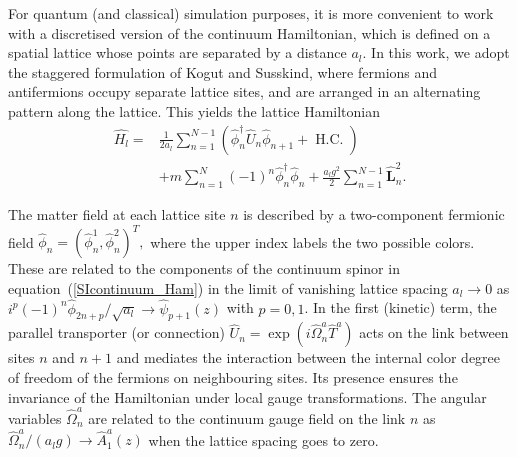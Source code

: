 \documentclass[twocolumn,aps,showpacs,prb,superscriptaddress,floatfix,10pt,nofootinbib]{revtex4-2}
\begin{document}
For quantum (and classical) simulation purposes, it is more convenient to work with a discretised version of the continuum Hamiltonian, which is defined on a spatial lattice whose points are separated by a distance $a_l$. In this work, we adopt the staggered formulation of Kogut and Susskind, where fermions and antifermions occupy separate lattice sites, and are arranged in an alternating pattern along the lattice. This yields the lattice Hamiltonian
\begin{equation}
\begin{split}
\hat{H_l} = &\frac{1}{2a_l} \sum_{n=1}^{N-1} \left( \hat{\phi}_{n}^\dagger \hat{U}_{n} \hat{\phi}_{n+1} + \operatorname{H.C.}\right)\\ & +m \sum_{n=1}^{N} (-1)^{n} \hat{\phi}_{n}^\dagger \hat{\phi}_{n}  + \frac{a_l g^{2}}{2} \sum_{n=1}^{N-1} \hat{\boldsymbol{L}}_{n}^{2}. \label{SIeq:KSham}
\end{split}
\end{equation}

The matter field at each lattice site $n$ is described by a two-component fermionic field $\hat{\phi}_{n}=(\hat{\phi}_{n}^{1},\hat{\phi}_{n}^{2})^{T},$
where the upper index labels the two possible colors. These are related to the components of the continuum spinor in equation~(\ref{SIcontinuum_Ham}) in the limit of vanishing lattice spacing $a_l \rightarrow 0$ as $i^{p}(-1)^{n}\hat{\phi}_{2n+p}/\sqrt{a_l}\rightarrow \hat{\psi}_{p+1}(z)$ with $p=0,1$.
In the first (kinetic) term, the parallel transporter (or connection) $\hat{U}_n=\exp(i\hat{\Omega}_{n}^{a}\hat{T}^{a})$ acts on the link between sites $n$ and $n+1$ and mediates the interaction between the internal color degree of freedom of the fermions on neighbouring sites. Its presence ensures the invariance of the Hamiltonian under local gauge transformations. The angular variables $\hat{\Omega}_{n}^{a}$ are related to the continuum gauge field on the link  $n$ as $\hat{\Omega}_{n}^{a}/(a_l g) \rightarrow \hat{A}_{1}^{a}(z)$ when the lattice spacing goes to zero.
\end{document}
